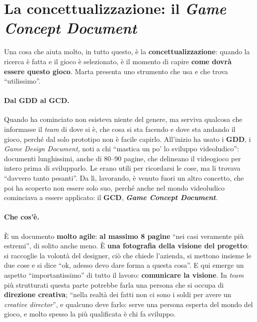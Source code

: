\section{La concettualizzazione: il \emph{Game Concept Document}}
\label{a13:sec:gcd}



Una cosa che aiuta molto, in tutto questo, è la \textbf{concettualizzazione}: quando la
ricerca è fatta e il gioco è selezionato, è il momento di capire \textbf{come dovrà essere
questo gioco}. Marta presenta uno strumento che usa e che trova ``utilissimo''.

\paragraph{Dal GDD al GCD.} Quando ha cominciato non esisteva niente del genere, ma serviva
qualcosa che informasse il \emph{team} di dove si è, che cosa si sta facendo e dove sta
andando il gioco, perché dal solo prototipo non è facile capirlo. All'inizio ha usato i
\textbf{GDD}, i \emph{Game Design Document}, noti a chi ``mastica un po' lo sviluppo
videoludico'': documenti lunghissimi, anche di 80--90 pagine, che delineano il videogioco
per intero prima di svilupparlo. Le erano utili per ricordarsi le cose, ma li trovava
``davvero tanto pesanti''. Da lì, lavorando, è venuto fuori un altro concetto, che poi ha
scoperto non essere solo suo, perché anche nel mondo videoludico cominciava a essere
applicato: il \textbf{GCD}, \textbf{\emph{Game Concept Document}}.

\paragraph{Che cos'è.} È un documento \textbf{molto agile}: \textbf{al massimo 8 pagine}
``nei casi veramente più estremi'', di solito anche meno. È \textbf{una fotografia della
visione del progetto}: si raccoglie la volontà del designer, ciò che chiede l'azienda, si
mettono insieme le due cose e si dice ``ok, adesso devo dare forma a questa cosa''. E qui
emerge un aspetto ``importantissimo'' di tutto il lavoro: \textbf{comunicare la visione}.
In \emph{team} più strutturati questa parte potrebbe farla una persona che si occupa di
\textbf{direzione creativa}; ``nella realtà dei fatti non ci sono i soldi per avere un
\emph{creative director}'', e qualcuno deve farlo: serve una persona esperta del mondo del
gioco, e molto spesso la più qualificata è chi fa sviluppo.

